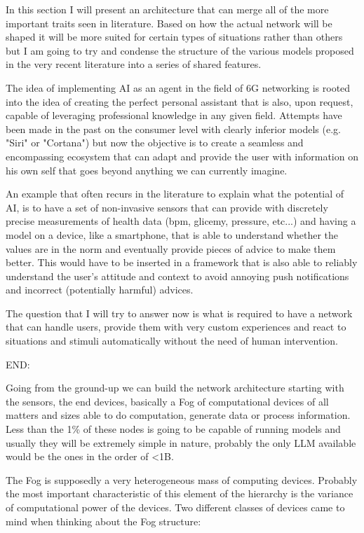 

In this section I will present an architecture that can merge all of the more important traits seen
in literature. Based on how the actual network will be shaped it will be more suited for certain
types of situations rather than others but I am going to try and condense the structure of the various models proposed in the very recent literature into a series of shared features.

The idea of implementing AI as an agent in the field of 6G networking is rooted into the idea of
creating the perfect personal assistant that is also, upon request, capable of leveraging
professional knowledge in any given field. Attempts have been made in the past on the consumer level with clearly inferior models (e.g. "Siri" or "Cortana") but now the objective is to create a seamless and encompassing ecosystem that can adapt and provide the user with information on his own self that goes beyond anything we can currently imagine.

An example that often recurs in the literature to explain what the potential of AI, is to have a set of non-invasive sensors that can provide with discretely precise measurements of health data (bpm,
glicemy, pressure, etc...) and having a model on a device, like a smartphone, that is able to understand
whether the values are in the norm and eventually provide pieces of advice to make them better. This would have to be inserted in a framework that is also able to reliably understand the user's attitude and
context to avoid annoying push notifications and incorrect (potentially harmful) advices.

The question that I will try to answer now is what is required to have a network that can handle
users, provide them with very custom experiences and react to situations and stimuli automatically
without the need of human intervention.

\bigskip
\noindent
END:
\label{ssec:end}

Going from the ground-up we can build the network architecture starting with the sensors, the end
devices, basically a Fog of computational devices of all matters and sizes able to do
computation, generate data or process information. Less than the 1\% of these nodes is going to be
capable of running models and usually they will be extremely simple in nature, probably the only LLM
available would be the ones in the order of <1B.

The Fog is supposedly a very heterogeneous mass of computing devices. Probably the most important
characteristic of this element of the hierarchy is the variance of computational power of the
devices. Two different classes of devices came to mind when thinking about the Fog structure:

